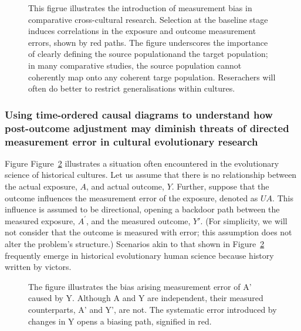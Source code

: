 \documentclass[
  singlecolumn]{article}
\begin{document}
\begin{figure}


\caption{\label{fig-dag-dep-u-effect-selection}This figrue illustrates
the introduction of measurement bias in comparative cross-cultural
research. Selection at the baseline stage induces correlations in the
exposure and outcome measurement errors, shown by red paths. The figure
underscores the importance of clearly defining the source populationand
the target population; in many comparative studies, the source
population cannot coherently map onto any coherent targe population.
Reserachers will often do better to restrict generalisations within
cultures.}

\end{figure}%

\subsubsection{Using time-ordered causal diagrams to understand how
post-outcome adjustment may diminish threats of directed measurement
error in cultural evolutionary
research}\label{using-time-ordered-causal-diagrams-to-understand-how-post-outcome-adjustment-may-diminish-threats-of-directed-measurement-error-in-cultural-evolutionary-research}

Figure Figure~\ref{fig-dag-measure-selection-0} illustrates a situation
often encountered in the evolutionary science of historical cultures.
Let us assume that there is no relationship between the actual exposure,
\(A\), and actual outcome, \(Y\). Further, suppose that the outcome
influences the measurement error of the exposure, denoted as \(UA\).
This influence is assumed to be directional, opening a backdoor path
between the measured exposure, \(A^{\prime}\), and the measured outcome,
\(Y'\). (For simplicity, we will not consider that the outcome is
measured with error; this assumption does not alter the problem's
structure.) Scenarios akin to that shown in
Figure~\ref{fig-dag-measure-selection-0} frequently emerge in historical
evolutionary human science because history written by victors.

\begin{figure}


\caption{\label{fig-dag-measure-selection-0}The figure illustrates the
bias arising measurement error of A' caused by Y. Although A and Y are
independent, their measured counterparts, A' and Y', are not. The
systematic error introduced by changes in Y opens a biasing path,
signified in red.}

\end{figure}%
\end{document}
